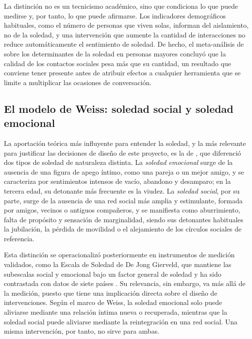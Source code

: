 La distinción no es un tecnicismo académico, sino que condiciona lo que puede medirse y, por tanto, lo que
puede afirmarse. Los indicadores demográficos habituales, como el número de personas que viven solas, informan
del aislamiento, no de la soledad, y una intervención que aumente la cantidad de interacciones no reduce
automáticamente el sentimiento de soledad. De hecho, el meta-análisis de \textcite{Pinquart2001} sobre los
determinantes de la soledad en personas mayores concluyó que la calidad de los contactos sociales pesa más que
su cantidad, un resultado que conviene tener presente antes de atribuir efectos a cualquier herramienta que se
limite a multiplicar las ocasiones de conversación.

\subsection{El modelo de Weiss: soledad social y soledad emocional}

La aportación teórica más influyente para entender la soledad, y la más relevante para justificar las
decisiones de diseño de este proyecto, es la de \textcite{Weiss1973}, que diferenció dos tipos de soledad de
naturaleza distinta. La \textit{soledad emocional} surge de la ausencia de una figura de apego íntimo, como
una pareja o un mejor amigo, y se caracteriza por sentimientos intensos de vacío, abandono y desamparo; en la
tercera edad, su detonante más frecuente es la viudez. La \textit{soledad social}, por su parte, surge de la
ausencia de una red social más amplia y estimulante, formada por amigos, vecinos o antiguos compañeros, y se
manifiesta como aburrimiento, falta de propósito y sensación de marginalidad, siendo sus detonantes habituales
la jubilación, la pérdida de movilidad o el alejamiento de los círculos sociales de referencia.

Esta distinción se operacionalizó posteriormente en instrumentos de medición validados, como la Escala de
Soledad de De Jong Gierveld, que mantiene las subescalas social y emocional bajo un factor general de soledad
y ha sido contrastada con datos de siete países \citep{DeJongGierveld2010}. Su relevancia, sin embargo, va más
allá de la medición, puesto que tiene una implicación directa sobre el diseño de intervenciones. Según el
marco de Weiss, la soledad emocional solo puede aliviarse mediante una relación íntima nueva o recuperada,
mientras que la soledad social puede aliviarse mediante la reintegración en una red social. Una misma
intervención, por tanto, no sirve para ambas.

